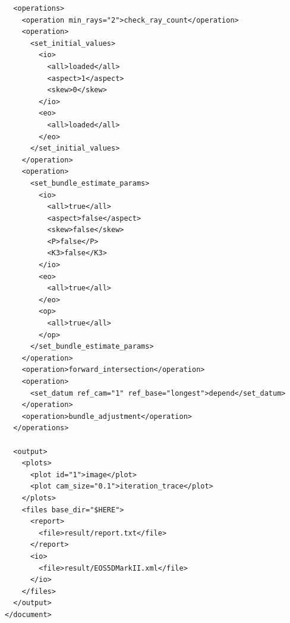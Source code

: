 \documentclass{article}
\begin{document}
\begin{verbatim}
  <operations>
    <operation min_rays="2">check_ray_count</operation>
    <operation>
      <set_initial_values>
        <io>
          <all>loaded</all>
          <aspect>1</aspect>
          <skew>0</skew>
        </io>
        <eo>
          <all>loaded</all>
        </eo>
      </set_initial_values>
    </operation>
    <operation>
      <set_bundle_estimate_params>
        <io>
          <all>true</all>
          <aspect>false</aspect>
          <skew>false</skew>
          <P>false</P>
          <K3>false</K3>
        </io>
        <eo>
          <all>true</all>
        </eo>
        <op>
          <all>true</all>
        </op>
      </set_bundle_estimate_params>
    </operation>
    <operation>forward_intersection</operation>
    <operation>
      <set_datum ref_cam="1" ref_base="longest">depend</set_datum>
    </operation>
    <operation>bundle_adjustment</operation>
  </operations>

  <output>
    <plots>
      <plot id="1">image</plot>
      <plot cam_size="0.1">iteration_trace</plot>
    </plots>
    <files base_dir="$HERE">
      <report>
        <file>result/report.txt</file>
      </report>
      <io>
        <file>result/EOS5DMarkII.xml</file>
      </io>
    </files>
  </output>
</document>
\end{verbatim}
\end{document}
